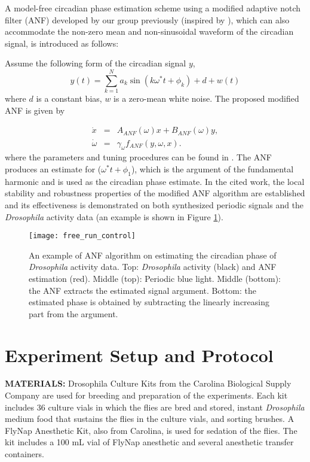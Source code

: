 \documentclass[11pt, onecolumn]{IEEEtran}
\begin{document}
A model-free circadian phase estimation scheme using a modified adaptive notch filter (ANF) developed by our group previously \cite{ZhangACC13} (inspired by \cite{Hsu1999}), which can also accommodate the non-zero mean and non-sinusoidal waveform of the circadian signal, is introduced as follows:

Assume the following form of the circadian signal $y$,
\begin{equation*}
   y(t)= \sum_{k=1}^N a_k \sin(k\omega^* t + \phi_k) + d + w(t)
\end{equation*}where $d$ is a constant bias, $w$ is a zero-mean white noise. The proposed modified ANF is given by

\begin{eqnarray}
  \dot{x} &=& A_{ANF}(\omega)x+B_{ANF}(\omega)y,\label{ANF1}\\
  \dot{\omega} &=& \gamma_\omega f_{ANF}(y,\omega, x).\label{ANF2}
\end{eqnarray}where the parameters and tuning procedures can be found in \cite{ZhangACC13}. The ANF produces an estimate for ($\omega^*t+\phi_1$), which is the argument of the fundamental harmonic and is used as the circadian phase estimate. In the cited work, the local stability and robustness properties of the modified ANF algorithm are established and its effectiveness is demonstrated on both synthesized periodic signals and the {\em Drosophila} activity data (an example is shown in Figure \ref{free_run:fig}).

\begin{figure}[ht]
\bc
  \texttt{[image: free\_run\_control]}
\ec
  \caption{An example of ANF algorithm on estimating the circadian phase of \emph{Drosophila} activity data. Top: {\em Drosophila} activity (black) and ANF estimation (red). Middle (top): Periodic blue light. Middle (bottom): the ANF extracts the estimated signal argument. Bottom: the estimated phase is obtained by subtracting the linearly increasing part from the argument.}\label{free_run:fig}
\end{figure}



\section{Experiment Setup and Protocol}\label{Protocol:Sec}
\textbf{MATERIALS:}
Drosophila Culture Kits from the Carolina Biological Supply Company are used for breeding and preparation of the experiments. Each kit includes 36 culture vials in which the flies are bred and stored, instant \textit{Drosophila} medium food that sustains the flies in the culture vials, and sorting brushes. A FlyNap Anesthetic Kit, also from Carolina, is used for sedation of the flies. The kit includes a 100 mL vial of FlyNap anesthetic and several anesthetic transfer containers.
\end{document}
